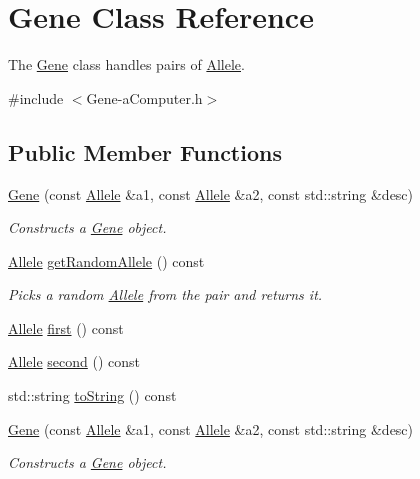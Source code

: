 \hypertarget{class_gene}{}\section{Gene Class Reference}
\label{class_gene}


The \hyperlink{class_gene}{Gene} class handles pairs of \hyperlink{class_allele}{Allele}.  




{\ttfamily \#include $<$Gene-\/a\+Computer.\+h$>$}

\subsection*{Public Member Functions}
\begin{DoxyCompactItemize}
\item 
\hyperlink{class_gene_a3e8f531d014dd6aa2cfb25c7fed5ae5d}{Gene} (const \hyperlink{class_allele}{Allele} \&a1, const \hyperlink{class_allele}{Allele} \&a2, const std\+::string \&desc)
\begin{DoxyCompactList}\small\item\em Constructs a \hyperlink{class_gene}{Gene} object. \end{DoxyCompactList}\item 
\hyperlink{class_allele}{Allele} \hyperlink{class_gene_a7b631b7a53729db7523430049c89e463}{get\+Random\+Allele} () const 
\begin{DoxyCompactList}\small\item\em Picks a random \hyperlink{class_allele}{Allele} from the pair and returns it. \end{DoxyCompactList}\item 
\hyperlink{class_allele}{Allele} \hyperlink{class_gene_a935e5f290b1e66b970ed8b52a97b1ae9}{first} () const 
\item 
\hyperlink{class_allele}{Allele} \hyperlink{class_gene_a7c744b5c6e8d305c47c1563cc0e2acc8}{second} () const 
\item 
std\+::string \hyperlink{class_gene_a3d5569b6329c23acf791ce310735fc5d}{to\+String} () const 
\item 
\hyperlink{class_gene_a3e8f531d014dd6aa2cfb25c7fed5ae5d}{Gene} (const \hyperlink{class_allele}{Allele} \&a1, const \hyperlink{class_allele}{Allele} \&a2, const std\+::string \&desc)
\begin{DoxyCompactList}\small\item\em Constructs a \hyperlink{class_gene}{Gene} object. \end{DoxyCompactList}\item 

\end{DoxyCompactItemize}
